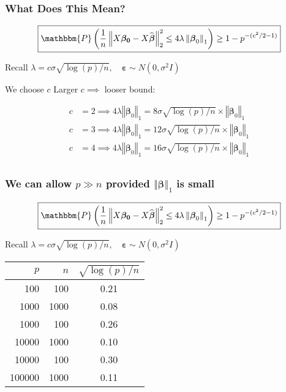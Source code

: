 \begin{frame}
  \frametitle{What Does This Mean?}
    \[
      \boxed{\mathbbm{P}\left(\frac{1}{n}\left\Vert X\boldsymbol{\beta_0} - X\widehat{\boldsymbol{\beta}} \right\Vert_2^2 \leq 4 \lambda \left \Vert \boldsymbol{\beta}_0 \right\Vert_1\right) \geq 1 - p^{-(c^2/2 - 1)}}
    \]

    \begin{block}{Recall}
      $\lambda = c \sigma \sqrt{\log(p)/n}, \quad \boldsymbol{\varepsilon} \sim N(0, \sigma^2 I)$
    \end{block}

    \begin{block}{We choose $c$}
      Larger $c \implies$ looser bound:

      \begin{align*}
        c &= 2 \implies 4\lambda \left\Vert \boldsymbol{\beta}_0 \right\Vert_1= 8\sigma\sqrt{\log(p)/n}\times \left\Vert\boldsymbol{\beta}_0 \right\Vert_1\\
        c &= 3 \implies 4\lambda \left\Vert \boldsymbol{\beta}_0 \right\Vert_1= 12\sigma\sqrt{\log(p)/n}\times \left\Vert\boldsymbol{\beta}_0 \right\Vert_1\\
        c &= 4 \implies 4\lambda \left\Vert \boldsymbol{\beta}_0 \right\Vert_1= 16\sigma\sqrt{\log(p)/n}\times \left\Vert\boldsymbol{\beta}_0 \right\Vert_1\\
      \end{align*}
    \end{block}

\end{frame}
\begin{frame}
  \frametitle{We can allow $p\gg n$ provided $\left\Vert \boldsymbol{\beta}\right\Vert_1$ is small}
    \[
      \boxed{\mathbbm{P}\left(\frac{1}{n}\left\Vert X\boldsymbol{\beta_0} - X\widehat{\boldsymbol{\beta}} \right\Vert_2^2 \leq 4 \lambda \left \Vert \boldsymbol{\beta}_0 \right\Vert_1\right) \geq 1 - p^{-(c^2/2 - 1)}}
    \]

    \begin{block}{Recall}
      $\lambda = c \sigma \sqrt{\log(p)/n}, \quad \boldsymbol{\varepsilon} \sim N(0, \sigma^2 I)$

      \begin{center}
        \small
      \begin{tabular}[h]{rrc}
        \hline \hline
        $p$ & $n$ & $\sqrt{\log(p)/n}$ \\
        \hline
        100 & 100 & 0.21\\
        1000 & 1000 & 0.08\\
        \hline
        1000 & 100 & 0.26\\
        10000 & 1000 & 0.10\\
        \hline
        10000 & 100 & 0.30\\
        100000 & 1000 & 0.11\\ 
        \hline \hline
      \end{tabular}
    \end{center}

    \end{block}
\end{frame}
